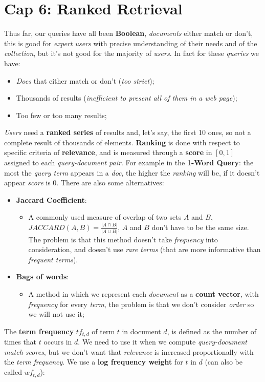 \documentclass{article}
\begin{document}
\section{Cap 6: Ranked Retrieval}
Thus far, our queries have all been \textbf{Boolean}, \emph{documents} either match or don’t, this is good for \emph{expert users} with precise understanding of their needs and of the \emph{collection}, but it's not good for the majority of \emph{users}. In fact for these \emph{queries} we have:
\begin{itemize}
\item \emph{Docs} that either match or don't (\emph{too strict});
\item Thousands of results (\emph{inefficient to present all of them in a web page});
\item Too few or too many results;
\end{itemize}
\emph{Users} need a\textbf{ ranked series} of results and, let's say, the first 10 ones, so not a complete result of thousands of elements. \textbf{Ranking} is done with respect to specific criteria of \textbf{relevance}, and is measured through a \textbf{score} in $\left [ 0,1 \right ]$ assigned to each \emph{query-document pair}. For example in the \textbf{1-Word Query}: the most the \emph{query term} appears in a \emph{doc}, the higher the \emph{ranking} will be, if it doesn't appear \emph{score} is 0. There are also some alternatives:
\begin{itemize}
\item \textbf{Jaccard Coefficient}: 
\begin{itemize}
\item A commonly used measure of overlap of two sets $A$ and $B$, $JACCARD(A,B) = \frac{\left | A \cap B \right |}{\left | A \cup B \right |}$, $A$ and $B$ don't have to be the same size. The problem is that this method doesn't take \emph{frequency} into consideration, and doesn't use \emph{rare terms} (that are more informative than \emph{frequent terms}). 
\end{itemize}
\item \textbf{Bags of words}:
\begin{itemize}
\item A method in which we represent each \emph{document} as a \textbf{count vector}, with \emph{frequency} for every \emph{term}, the problem is that we don't consider \emph{order} so we will not use it;
\end{itemize}
\end{itemize}
The \textbf{term frequency} $tf_{t,d}$ of term $t$ in document $d$, is defined as the number of times that $t$ occurs in $d$. We need to use it when we compute \emph{query-document match scores}, but we don't want that \emph{relevance} is increased proportionally with the \emph{term frequency}. We use a \textbf{log frequency weight} for $t$ in $d$ (can also be called $wf_{t,d}$): 
\end{document}
